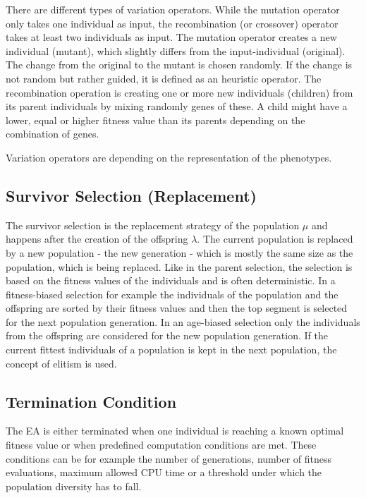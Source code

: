         There are different types of variation operators. While the mutation operator only takes one individual as input, the recombination (or crossover) operator takes at least two individuals as input. The mutation operator creates a new individual (mutant), which slightly differs from the input-individual (original). The change from the original to the mutant is chosen randomly. If the change is not random but rather guided, it is defined as an heuristic operator. The recombination operation is creating one or more new individuals (children) from its parent individuals by mixing randomly genes of these. A child might have a lower, equal or higher fitness value than its parents depending on the combination of genes.
        
        Variation operators are depending on the representation of the phenotypes.
        
        \subsection{Survivor Selection (Replacement)}
        The survivor selection is the replacement strategy of the population $\mu$ and happens after the creation of the offspring $\lambda$. The current population is replaced by a new population - the new generation - which is mostly the same size as the population, which is being replaced. Like in the parent selection, the selection is based on the fitness values of the individuals and is often deterministic. In a fitness-biased selection for example the individuals of the population and the offspring are sorted by their fitness values and then the top segment is selected for the next population generation. In an age-biased selection only the individuals from the offspring are considered for the new population generation. If the current fittest individuals of a population is kept in the next population, the concept of elitism is used.
        
        \subsection{Termination Condition}
        The EA is either terminated when one individual is reaching a known optimal fitness value or when predefined computation conditions are met. These conditions can be for example the number of generations, number of fitness evaluations, maximum allowed CPU time or a threshold under which the population diversity has to fall.
        
